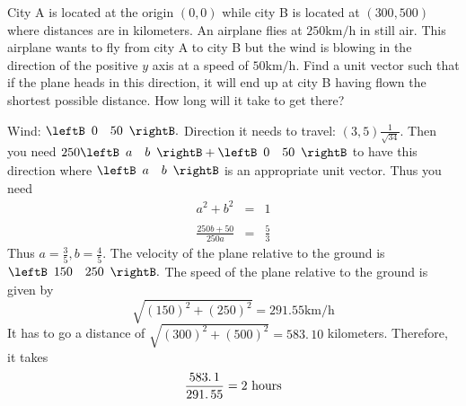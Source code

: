 \begin{enumialphparenastyle}
\begin{ex} 
City A is located at the origin $\left( 0,0 \right)$ while city B is located at $\left(300,500 \right) $ where distances are in kilometers. An airplane flies at $250\textrm{km}/\textrm{h}$ in still air. This airplane wants to fly from city A to city
B but the wind is blowing in the direction of the positive $y$ axis at a
speed of $50\textrm{km}/\textrm{h}$. Find a unit vector such that if the plane heads
in this direction, it will end up at city B having flown the shortest
possible distance. How long will it take to get there? \vspace{1mm}
\begin{sol}
Wind: $\leftB \begin{array}{cc}
0 & 50
\end{array}
\rightB .$ Direction it needs to travel: $\left( 3,5 \right) \frac{1}{\sqrt{34}}.$ Then you need $250 \leftB \begin{array}{cc}
 a & b
\end{array}
\rightB + \leftB \begin{array}{cc}
0 & 50
\end{array}
\rightB $ to
have this direction where $\leftB 
\begin{array}{cc}
 a & b
\end{array}
\rightB $ is an appropriate unit
vector. Thus you need
\begin{eqnarray*}
a^{2}+b^{2} &=&1 \\ 
& & \\
\frac{250b+50}{250a} &=&\frac{5}{3}
\end{eqnarray*}
Thus $a=\frac{3}{5},b=\frac{4}{5}.$ The velocity of the plane relative
to the ground is $\leftB
\begin{array}{cc}
150 & 250
\end{array}
\rightB .$ The speed of the plane relative to the ground is given by 
\[
\sqrt{\left( 150\right) ^{2}+\left( 250\right) ^{2}}=
291.55 \textrm{km}/\textrm{h}
\]
It has to go a distance of $\sqrt{\left( 300\right) ^{2}+\left( 500\right)
^{2}}=\allowbreak 583.\,\allowbreak 10$ kilometers. Therefore, it takes
\[
\frac{\allowbreak 583.\,\allowbreak 1}{\allowbreak 291.\,\allowbreak 55}=2
\text{ hours}
\]
\end{sol}
\end{ex}


\end{enumialphparenastyle}
